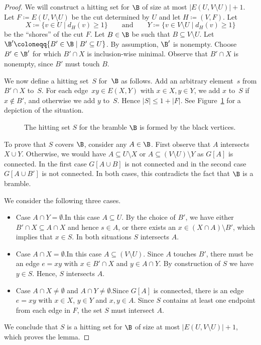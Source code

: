 \begin{proof}
We will construct a hitting set for $\B$ of size at most $|E(U,V\setminus U)|+1$.
Let $F\coloneqq E(U,V\setminus U)$ be the cut determined by $U$ and let $H\coloneqq (V,F)$. Let 
\[ 
X\coloneqq \{v\in U\mid d_H(v)\geq 1\}\qquad\text{and}\qquad Y\coloneqq \{v\in V\setminus U\mid d_H(v)\geq 1\}
\]
be the ``shores'' of the cut $F$. Let $B\in \B$ be such that $B\subseteq V\setminus U$. Let $\B'\coloneqq \{B'\in \B\mid B'\subseteq U\}$. By assumption, $\B'$ is nonempty. Choose $B'\in \B'$ for which $B'\cap X$ is inclusion-wise minimal. Observe that $B'\cap X$ is nonempty, since $B'$ must touch $B$. 

We now define a hitting set~$S$ for~$\B$ as follows. Add an arbitrary element~$s$ from \hbox{$B'\cap X$} to~$S$. For each edge~$xy\in E(X,Y)$ with $x\in X, y\in Y$, we add $x$ to~$S$ if $x\not\in B'$, and otherwise we add $y$ to~$S$. Hence $|S|\leq 1+|F|$. See Figure~\ref{hittingset} for a depiction of the situation.

\begin{figure}[htb]\centering
\hittingsetTikZ
\caption{The hitting set $S$ for the bramble $\B$ is formed by the black vertices.\label{hittingset}}
\end{figure}

To prove that $S$ covers $\B$, consider any $A\in \B$. First observe that $A$ intersects $X\cup Y$. Otherwise, we would have $A\subseteq U\setminus X$ or $A\subseteq (V\setminus U)\setminus Y$ as $G[A]$ is connected. In the first case $G[A\cup B]$ is not connected and in the second case $G[A\cup B']$ is not connected. In both cases, this contradicts the fact that $\B$ is a bramble.

We consider the following three cases. 
\begin{itemize}
\item Case $A\cap Y=\emptyset$.\quad In this case $A\subseteq U$. By the choice of $B'$, we have either $B'\cap X\subseteq A\cap X$ and hence $s\in A$, or there exists an $x\in (X\cap A)\setminus B'$, which implies that $x\in S$. In both situations $S$ intersects $A$.
\item Case $A\cap X=\emptyset$.\quad In this case $A\subseteq (V\setminus U)$. Since $A$ touches $B'$, there must be an edge $e=xy$ with $x\in B'\cap X$ and $y\in A\cap Y$. By construction of $S$ we have $y\in S$. Hence, $S$ intersects $A$.
\item Case $A\cap X\neq \emptyset$ and $A\cap Y\neq \emptyset$.\quad Since $G[A]$ is connected, there is an edge $e=xy$ with $x\in X$, $y\in Y$ and $x,y\in A$. Since $S$ contains at least one endpoint from each edge in $F$, the set $S$ must intersect $A$.
\end{itemize}
We conclude that $S$ is a hitting set for $\B$ of size at most $|E(U,V\setminus U)|+1$, which proves the lemma.
\end{proof}

